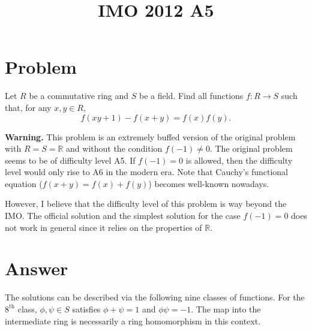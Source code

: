 \documentclass{article}
\title{IMO 2012 A5}
\author{}
\date{}
\newcommand{\R}{\mathbb{R}}
\begin{document}
\maketitle





\section*{Problem}

Let $R$ be a commutative ring and $S$ be a field.
Find all functions $f : R \to S$ such that, for any $x, y \in R$,
\[ f(xy + 1) - f(x + y) = f(x) f(y). \tag{*}\label{2012a5-eq0} \]

\textbf{Warning.}
This problem is an extremely buffed version of the original problem with $R = S = \R$ and without the condition $f(-1) \neq 0$.
The original problem seems to be of difficulty level A5.
If $f(-1) = 0$ is allowed, then the difficulty level would only rise to A6 in the modern era.
Note that Cauchy's functional equation ($f(x + y) = f(x) + f(y)$) becomes well-known nowadays.

However, I believe that the difficulty level of this problem is way beyond the IMO.
The official solution and the simplest solution for the case $f(-1) = 0$ does not work in general since it relies on the properties of $\R$.









\section*{Answer}

The solutions can be described via the following nine classes of functions.
For the $8^{\text{th}}$ class, $\phi, \psi \in S$ satisfies $\phi + \psi = 1$ and $\phi \psi = -1$.
The map into the intermediate ring is necessarily a ring homomorphism in this context.
\end{document}
